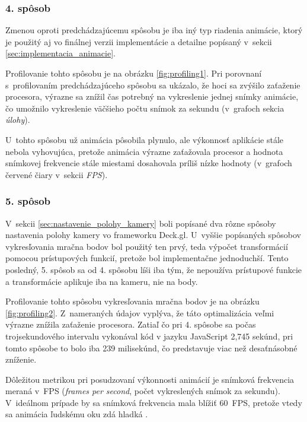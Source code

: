 \subsubsection{4. spôsob}

Zmenou oproti predchádzajúcemu spôsobu je iba iný typ riadenia animácie, ktorý je použitý aj vo finálnej verzii implementácie a detailne popísaný v~sekcii \ref{sec:implementacia_animacie}.

Profilovanie tohto spôsobu je na obrázku \ref{fig:profiling1}. Pri porovnaní s~profilovaním predchádzajúceho spôsobu sa ukázalo, že hoci sa zvýšilo zaťaženie procesora, výrazne sa znížil čas potrebný na vykreslenie jednej snímky animácie, čo umožnilo vykreslenie väčšieho počtu snímok za sekundu (v~grafoch sekcia \emph{úlohy}).

U~tohto spôsobu už animácia pôsobila plynulo, ale výkonnosť aplikácie stále nebola vyhovujúca, pretože animácia výrazne zaťažovala procesor a hodnota snímkovej frekvencie stále miestami dosahovala príliš nízke hodnoty (v~grafoch červené čiary v~sekcii \emph{FPS}).

\subsubsection{5. spôsob}

V~sekcii \ref{sec:nastavenie_polohy_kamery} boli popísané dva rôzne spôsoby nastavenia polohy kamery vo frameworku Deck.gl. U~vyššie popísaných spôsobov vykresľovania mračna bodov bol použitý ten prvý, teda výpočet transformácií pomocou prístupových funkcií, pretože bol implementačne jednoduchší. Tento posledný, 5. spôsob sa od 4. spôsobu líši iba tým, že nepoužíva prístupové funkcie a transformácie aplikuje iba na kameru, nie na body. 

Profilovanie tohto spôsobu vykresľovania mračna bodov je na obrázku \ref{fig:profiling2}. Z~nameraných údajov vyplýva, že táto optimalizácia veľmi výrazne znížila zaťaženie procesora. Zatiaľ čo pri 4. spôsobe sa počas trojsekundového intervalu vykonával kód v jazyku JavaScript 2,745 sekúnd, pri tomto spôsobe to bolo iba 239 milisekúnd, čo predstavuje viac než desaťnásobné zníženie.

Dôležitou metrikou pri posudzovaní výkonnosti animácií je snímková frekvencia meraná v~FPS (\emph{frames per second}, počet vykreslených snímok za sekundu). V~ideálnom prípade by sa snímková frekvencia mala blížiť 60~FPS, pretože vtedy sa animácia ľudskému oku zdá hladká \cite{chrome_profiling}.

